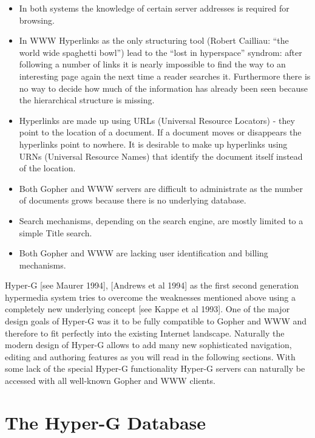 \begin{itemize}

\item In both systems the knowledge of certain server addresses is
required for browsing.

\item In WWW Hyperlinks as the only structuring tool (Robert Cailliau:
``the world wide spaghetti bowl'') lead to the ``lost in hyperspace''
syndrom: after following a number of links it is nearly impossible to
find the way to an interesting page again the next time a reader
searches it. Furthermore there is no way to decide how much of the
information has already been seen because the hierarchical structure
is missing.

\item Hyperlinks are made up using URLs (Universal Resource Locators)
- they point to the location of a document. If a document moves or
disappears the hyperlinks point to nowhere. It is desirable to make up
hyperlinks using URNs (Universal Resource Names) that identify the
document itself instead of the location.

\item Both Gopher and WWW servers are difficult to administrate as the
number of documents grows because there is no underlying database.

\item Search mechanisms, depending on the search engine, are mostly
limited to a simple Title search.

\item Both Gopher and WWW are lacking user identification and billing
mechanisms. 

\end{itemize}

Hyper-G [see Maurer 1994], [Andrews et al 1994] as the first second
generation hypermedia system tries to overcome the weaknesses
mentioned above using a completely new underlying concept [see Kappe
et al 1993]. One of the major design goals of Hyper-G was it to be
fully compatible to Gopher and WWW and therefore to fit perfectly into
the existing Internet landscape. Naturally the modern design of
Hyper-G allows to add many new sophisticated navigation, editing and
authoring features as you will read in the following sections. With
some lack of the special Hyper-G functionality Hyper-G servers can
naturally be accessed with all well-known Gopher and WWW clients.

\section{The Hyper-G Database}

